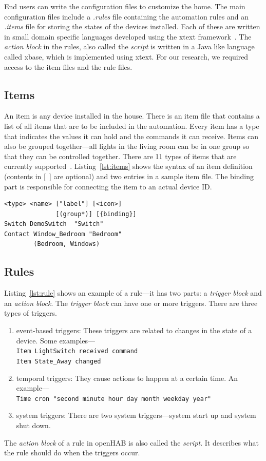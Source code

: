 \documentclass{sig-alternate-05-2015}
\begin{document}
End users can write the configuration files to customize the home. The main configuration files include a \textit{.rules} file containing the automation rules and an \textit{.items} file for storing the states of the devices installed. Each of these are written in small domain specific languages developed using the xtext framework~\cite{xtext}. The \textit{action block} in the rules, also called the \textit{script} is written in a Java like language called xbase, which is implemented using xtext. For our research, we required access to the item files and the rule files. 
\subsection{Items}
An item is any device installed in the house. There is an item file that contains a list of all items that are to be included in the automation. Every item has a type that indicates the values it can hold and the commands it can receive. Items can also be grouped together---all lights in the living room can be in one group so that they can be controlled together. There are 11 types of items that are currently supported~\cite{openhabitem}. Listing~\ref{lst:items} shows the syntax of an item definition (contents in [~] are optional) and two entries in a sample item file. The binding part is responsible for connecting the item to an actual device ID.
\begin{lstlisting}[caption={Syntax and two examples of item definitions.},label={lst:items}]
<type> <name> ["label"] [<icon>] 
              [(group*)] [{binding}]
Switch DemoSwitch  "Switch"
Contact Window_Bedroom "Bedroom" 
        (Bedroom, Windows)
\end{lstlisting}
 
\subsection{Rules}
Listing~\ref{lst:rule} shows an example of a rule---it has two parts: a \emph{trigger block} and an \emph{action block}. The \emph{trigger block} can have one or more triggers. There are three types of triggers.
\begin{enumerate} [topsep=0pt,itemsep=-1ex]
\item event-based triggers: These triggers are related to changes in the state of a device. Some examples---\\
\texttt{Item LightSwitch received command} \\
\texttt{Item State\_Away changed}
\item temporal triggers: They cause actions to happen at a certain time. An example---\\ \texttt{Time cron "second minute hour day month weekday year"}
\item system triggers: There are two system triggers---system start up and system shut down.
\end{enumerate}
The \emph{action block} of a rule in openHAB is also called the \emph{script}. It describes what the rule should do when the triggers occur.
\end{document}
